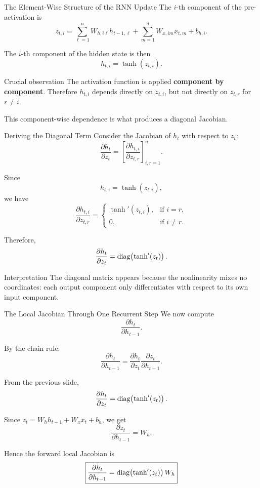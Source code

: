 \documentclass[aspectratio=169]{beamer}
\begin{document}
\begin{frame}{The Element-Wise Structure of the RNN Update}
\small
The $i$-th component of the pre-activation is
\[
z_{t,i} = \sum_{\ell=1}^{n} W_{h,i\ell} h_{t-1,\ell}
          + \sum_{m=1}^{d} W_{x,im} x_{t,m}
          + b_{h,i}.
\]

The $i$-th component of the hidden state is then
\[
h_{t,i} = \tanh(z_{t,i}).
\]

\vspace{0.2cm}
\begin{block}{Crucial observation}
The activation function is applied \textbf{component by component}. Therefore $h_{t,i}$ depends directly on $z_{t,i}$, but not directly on $z_{t,r}$ for $r \neq i$.
\end{block}

This component-wise dependence is what produces a diagonal Jacobian.
\end{frame}
%
%
\begin{frame}{Deriving the Diagonal Term}
\small
Consider the Jacobian of $h_t$ with respect to $z_t$:
\[
\frac{\partial h_t}{\partial z_t}
= \left[\frac{\partial h_{t,i}}{\partial z_{t,r}}\right]_{i,r=1}^{n}.
\]

Since
\[
h_{t,i} = \tanh(z_{t,i}),
\]
we have
\[
\frac{\partial h_{t,i}}{\partial z_{t,r}}
= 
\begin{cases}
\tanh'(z_{t,i}), & \text{if } i=r,\\[4pt]
0, & \text{if } i \neq r.
\end{cases}
\]

Therefore,
\[
\frac{\partial h_t}{\partial z_t}
= \operatorname{diag}\!\left(\tanh'(z_t)\right).
\]

\begin{alertblock}{Interpretation}
The diagonal matrix appears because the nonlinearity mixes no coordinates: each output component only differentiates with respect to its own input component.
\end{alertblock}
\end{frame}
%
%
\begin{frame}{The Local Jacobian Through One Recurrent Step}
\small
We now compute
\[
\frac{\partial h_t}{\partial h_{t-1}}.
\]

By the chain rule:
\[
\frac{\partial h_t}{\partial h_{t-1}}
= \frac{\partial h_t}{\partial z_t}
  \frac{\partial z_t}{\partial h_{t-1}}.
\]

From the previous slide,
\[
\frac{\partial h_t}{\partial z_t}
= \operatorname{diag}\!\left(\tanh'(z_t)\right).
\]

Since $z_t = W_h h_{t-1} + W_x x_t + b_h$, we get
\[
\frac{\partial z_t}{\partial h_{t-1}} = W_h.
\]

Hence the forward local Jacobian is
\[
\boxed{
\frac{\partial h_t}{\partial h_{t-1}}
= \operatorname{diag}\!\left(\tanh'(z_t)\right) W_h
}
\]
\end{frame}
\end{document}
